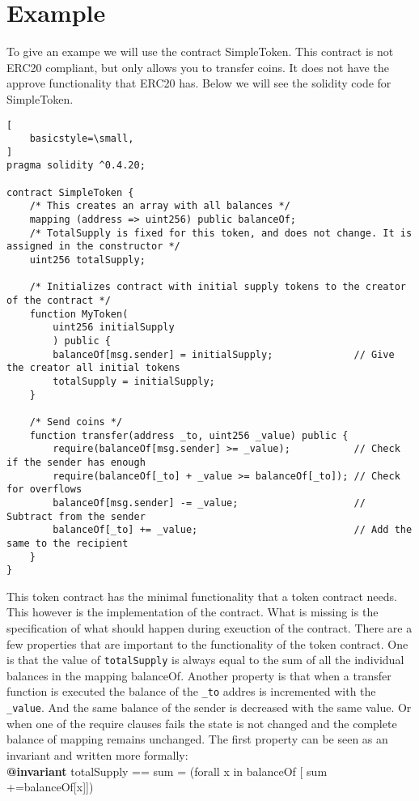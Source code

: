 \documentclass[a4paper]{article}
\begin{document}
\section{Example}
To give an exampe we will use the contract SimpleToken. This contract is not ERC20 compliant, but only allows you to transfer coins. It does not have the approve functionality that ERC20 has. Below we will see the solidity code for SimpleToken.
\begin{lstlisting}[
    basicstyle=\small, 
]
pragma solidity ^0.4.20;

contract SimpleToken {
    /* This creates an array with all balances */
    mapping (address => uint256) public balanceOf;
	/* TotalSupply is fixed for this token, and does not change. It is assigned in the constructor */
	uint256 totalSupply;

    /* Initializes contract with initial supply tokens to the creator of the contract */
    function MyToken(
        uint256 initialSupply
        ) public {
        balanceOf[msg.sender] = initialSupply;              // Give the creator all initial tokens
		totalSupply = initialSupply;
    }

    /* Send coins */
    function transfer(address _to, uint256 _value) public {
        require(balanceOf[msg.sender] >= _value);           // Check if the sender has enough
        require(balanceOf[_to] + _value >= balanceOf[_to]); // Check for overflows
        balanceOf[msg.sender] -= _value;                    // Subtract from the sender
        balanceOf[_to] += _value;                           // Add the same to the recipient
    }
}
\end{lstlisting}
This token contract has the minimal functionality that a token contract needs. This however is the implementation of the contract. What is missing is the specification of what should happen during exeuction of the contract. There are a few properties that are important to the functionality of the token contract. One is that the value of \texttt{totalSupply} is always equal to the sum of all the individual balances in the mapping balanceOf. Another property is that when a transfer function is executed the balance of the \texttt{\_to} addres is incremented with the \texttt{\_value}. And the same balance of the sender is decreased with the same value. Or when one of the require clauses fails the state is not changed and the complete balance of mapping remains unchanged. The first property can be seen as an invariant and written more formally: \\
 \textbf{@invariant}   \qquad totalSupply ==  sum = (forall x in balanceOf [ sum +=balanceOf[x]])\\
\end{document}
